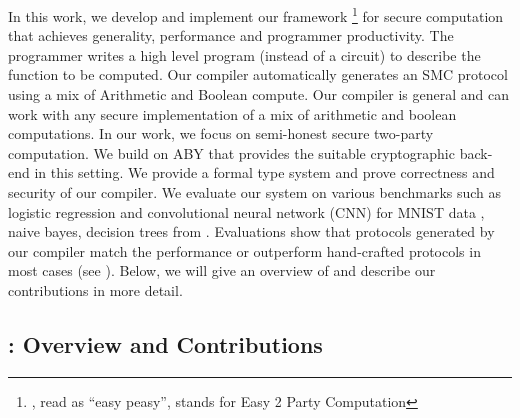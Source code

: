 In this work, we develop and implement our framework \tool\footnote{\tool, read as ``easy peasy'', stands for Easy 2 Party Computation} for secure
computation that achieves generality, performance and programmer
productivity. The programmer writes a high level 
program (instead of a circuit) to describe the function to be
computed. Our compiler automatically generates an SMC protocol using a
mix of Arithmetic and Boolean compute. Our compiler is general and can
work with any secure implementation of a mix of arithmetic and boolean
computations. In our work, we focus on semi-honest secure two-party
computation. We build on ABY \cite{aby} that provides the suitable
cryptographic back-end in this setting. We provide a formal type
system and prove correctness and security of our compiler. We evaluate
our system on various benchmarks such as logistic regression and
convolutional neural network (CNN) for MNIST data \cite{minionn},
naive bayes, decision trees from \cite{shafindss}. Evaluations show
that protocols generated by our compiler match
the performance or outperform hand-crafted protocols in most cases (see
). Below, we will  give an overview of \tool and
describe our contributions in more detail.


\subsection{\tool: Overview and Contributions} 
\label{sec:contrib}

